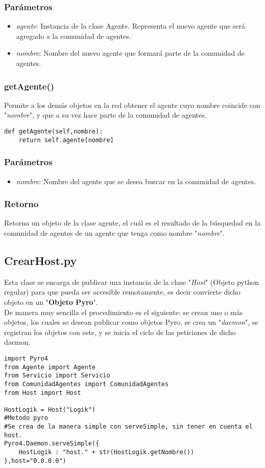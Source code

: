 \documentclass{article}
\begin{document}
\subsubsection*{Parámetros}
\begin{itemize}
\item \textit{agente}: Instancia de la clase Agente. Representa el nuevo agente que será agregado a la comunidad de agentes.
\item \textit{nombre}: Nombre del nuevo agente que formará parte de la comunidad de agentes.
\end{itemize}
\subsubsection{\textbf{getAgente}()}
Permite a los demás objetos en la red obtener el agente cuyo nombre coincide con "\textit{nombre}", y que a su vez hace parte de la comunidad de agentes.
\begin{lstlisting}
def getAgente(self,nombre):
    return self.agente[nombre]
\end{lstlisting}
\subsubsection*{Parámetros}
\begin{itemize}
\item \textit{nombre}: Nombre del agente que se desea buscar en la comunidad de agentes.
\end{itemize}
\subsubsection*{Retorno}
Retorna un objeto de la clase agente, el cuál es el resultado de la búsquedad en la comunidad de agentes de un agente que tenga como nombre "\textit{nombre}".
\subsection{CrearHost.py}
Esta clase se encarga de publicar una instancia de la clase "\textit{Host}" (Objeto python regular) para que pueda ser accesible remotamente, es decir convierte dicho objeto en un "\textbf{Objeto Pyro}".\\

De manera muy sencilla el procedimiento es el siguiente: se crean uno o más objetos, los cuales se desean publicar como objetos Pyro, se crea un "\textit{daemon}", se registran los objetos con este, y se inicia el ciclo de las peticiones de dicho daemon.
\begin{lstlisting}
import Pyro4
from Agente import Agente
from Servicio import Servicio
from ComunidadAgentes import ComunidadAgentes
from Host import Host

HostLogik = Host("Logik")
#Metodo pyro
#Se crea de la manera simple con serveSimple, sin tener en cuenta el host.
Pyro4.Daemon.serveSimple({
    HostLogik : "host." + str(HostLogik.getNombre())
},host="0.0.0.0")
\end{lstlisting}
\end{document}
